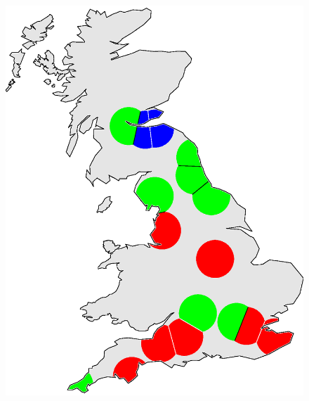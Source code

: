 \documentclass[output=paper]{LSP/langsci}
\begin{document}
\begin{figure}
\begin{minipage}[b]{0.30\linewidth}
    \includegraphics [keepaspectratio,width=.98\textwidth] {illustrations/wolk_noisy_cluster_frequency-3groups.eps}
\end{minipage}
\begin{minipage}[b]{0.30\linewidth}
    \centering

\end{minipage}
\end{figure}
\end{document}
